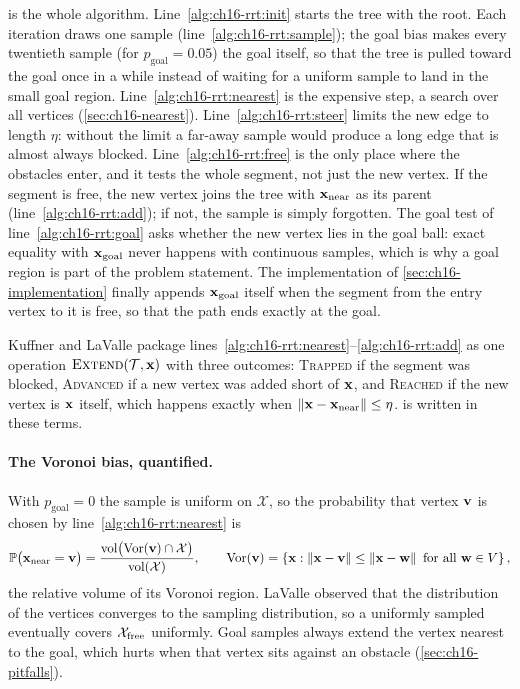  is the whole algorithm. Line~\ref{alg:ch16-rrt:init}
starts the tree with the root. Each iteration draws one sample
(line~\ref{alg:ch16-rrt:sample}); the goal bias makes every twentieth sample
(for $p_{\mathrm{goal}}=0.05$) the goal itself, so that the tree is pulled
toward the goal once in a while instead of waiting for a uniform sample to
land in the small goal region. Line~\ref{alg:ch16-rrt:nearest} is the
expensive step, a search over all vertices (\cref{sec:ch16-nearest}).
Line~\ref{alg:ch16-rrt:steer} limits the new edge to length $\eta$: without
the limit a far-away sample would produce a long edge that is almost always
blocked. Line~\ref{alg:ch16-rrt:free} is the only place where the obstacles
enter, and it tests the whole segment, not just the new vertex. If the
segment is free, the new vertex joins the tree with $\mathbf{x}_{\mathrm{near}}$ as
its parent (line~\ref{alg:ch16-rrt:add}); if not, the sample is simply
forgotten. The goal test of line~\ref{alg:ch16-rrt:goal} asks whether the new
vertex lies in the goal ball: exact equality with $\mathbf{x}_{\mathrm{goal}}$ never
happens with continuous samples, which is why a goal region is part of the
problem statement. The implementation of \cref{sec:ch16-implementation}
finally appends $\mathbf{x}_{\mathrm{goal}}$ itself when the segment from the entry
vertex to it is free, so that the path ends exactly at the goal.

Kuffner and LaValle \cite{kuffner2000rrtconnect} package
lines~\ref{alg:ch16-rrt:nearest}--\ref{alg:ch16-rrt:add} as one operation
$\textsc{Extend}(\mathcal{T},\mathbf{x})$ with three outcomes: \textsc{Trapped} if the segment
was blocked, \textsc{Advanced} if a new vertex was added short of $\mathbf{x}$, and
\textsc{Reached} if the new vertex is $\mathbf{x}$ itself, which happens exactly when
$\left\lVert \mathbf{x}-\mathbf{x}_{\mathrm{near}} \right\rVert\le\eta$.  is written in
these terms.

\paragraph{The Voronoi bias, quantified.}
With $p_{\mathrm{goal}}=0$ the sample is uniform on $\mathcal{X}$, so the
probability that vertex $\mathbf{v}$ is chosen by line~\ref{alg:ch16-rrt:nearest} is
\begin{equation}
\mathbb{P}\bigl(\mathbf{x}_{\mathrm{near}}=\mathbf{v}\bigr)=\frac{\mathrm{vol}\bigl(\mathrm{Vor}(\mathbf{v})\cap\mathcal{X}\bigr)}{\mathrm{vol}(\mathcal{X})},
\qquad \mathrm{Vor}(\mathbf{v})=\left\{ \mathbf{x} : \left\lVert \mathbf{x}-\mathbf{v} \right\rVert\le\left\lVert \mathbf{x}-\mathbf{w} \right\rVert\ \text{for all } \mathbf{w}\in V \right\},
\label{eq:ch16-voronoi}
\end{equation}
the relative volume of its Voronoi region. LaValle \cite{lavalle1998rrt} observed that
the distribution of the vertices converges to the sampling distribution, so
a uniformly sampled \rrt eventually covers $\mathcal{X}_{\mathrm{free}}$ uniformly. Goal samples
always extend the vertex nearest to the goal, which hurts when that vertex
sits against an obstacle (\cref{sec:ch16-pitfalls}).


